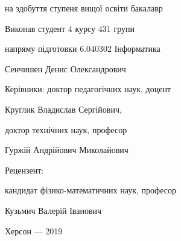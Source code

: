 \thispagestyle{empty}

{

на здобуття ступеня вищої освіти бакалавр

}

\vfill

\hfill\begin{minipage}[t]{0.65\textwidth}

Виконав студент 4 курсу 431 групи 

напряму підготовки 6.040302 Інформатика

Сенчишен Денис Олександрович

Керівники: доктор педагогічних наук, доцент

Круглик Владислав Сергійович,

доктор технічних наук, професор

Гуржій Андрійович Миколайович

Рецензент: 

кандидат фізико-математичних наук, професор

Кузьмич Валерій Іванович


\end{minipage}

\vfill

{\centering
Херсон --- 2019

}